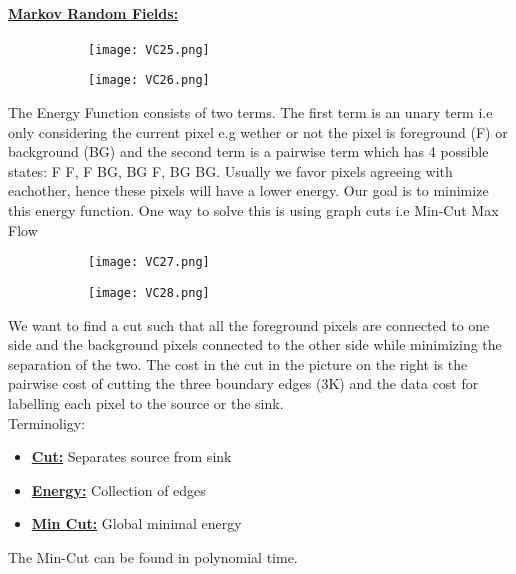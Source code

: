 \documentclass[8pt]{extreport}
\begin{document}
\paragraph{\underline{Markov Random Fields:}}
\begin{figure}[H]
\centering
\begin{subfigure}[b]{0.49\linewidth}
\texttt{[image: VC25.png]}
\end{subfigure}
\begin{subfigure}[b]{0.49\linewidth}
\texttt{[image: VC26.png]}
\end{subfigure}
\end{figure}
 The Energy Function consists of two terms. The first term is an unary  term i.e only considering the current pixel e.g wether or not the pixel is foreground (F) or background (BG) and the second term is a pairwise term which has 4 possible states: F F, F BG, BG F, BG BG. Usually we favor pixels agreeing with eachother, hence these pixels will have a lower energy. Our goal is to minimize this energy function. One way to solve this is using graph cuts i.e Min-Cut Max Flow
\begin{figure}[H]
\centering
\begin{subfigure}[b]{0.49\linewidth}
\texttt{[image: VC27.png]}
\end{subfigure}
\begin{subfigure}[b]{0.49\linewidth}
\texttt{[image: VC28.png]}
\end{subfigure}
\end{figure}
We want to find a cut such that all the foreground pixels are connected to one side and the background pixels connected to the other side while minimizing the separation of the two. The cost in the cut in the picture on the right is the pairwise cost of cutting the three boundary edges (3K) and the data cost for labelling each pixel to the source or the sink.\\
Terminoligy:
\begin{itemize}
\item \underline{\textbf{Cut:}} Separates source from sink
\item \underline{\textbf{Energy:}} Collection of edges
\item \underline{\textbf{Min Cut:}} Global minimal energy
\end{itemize}
The Min-Cut can be found in polynomial time.
\end{document}
